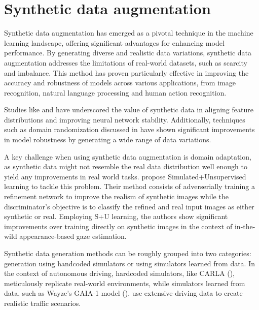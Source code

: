 



\section{Synthetic data augmentation}
Synthetic data augmentation has emerged as a pivotal technique in the machine learning landscape, offering significant advantages for enhancing model performance. By generating diverse and realistic data variations, synthetic data augmentation addresses the limitations of real-world datasets, such as scarcity and imbalance. This method has proven particularly effective in improving the accuracy and robustness of models across various applications, from image recognition, natural language processing and human action recognition.

Studies like \cite{peng2017synthetic} and \cite{Zheng_2016} have underscored the value of synthetic data in aligning feature distributions and improving neural network stability. Additionally, techniques such as domain randomization discussed in \cite{Tremblay_2018} have shown significant improvements in model robustness by generating a wide range of data variations. 

A key challenge when using synthetic data augmentation is domain adaptation, as synthetic data might not resemble the real data distribution well enough to yield any improvements in real world tasks. \cite{Shrivastava_2017} propose Simulated+Unsupervised learning to tackle this problem. Their method consists of adverserially training a refinement network to improve the realism of synthetic images while the discriminator's objective is to classify the refined and real input images as either synthetic or real. Employing S+U learning, the authors show significant improvements over training directly on synthetic images in the context of in-the-wild appearance-based gaze estimation. 

Synthetic data generation methods can be roughly grouped into two categories: generation using handcoded simulators or using simulators learned from data. In the context of autonomous driving, hardcoded simulators, like CARLA (\cite{Dosovitskiy17}), meticulously replicate real-world environments, while simulators learned from data, such as Wayze's GAIA-1 model (\cite{hu2023gaia1generativeworldmodel}), use extensive driving data to create realistic traffic scenarios. 

